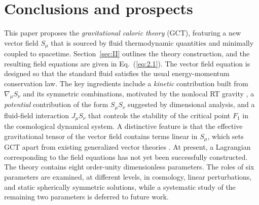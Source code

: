 \documentclass[aps,prd,twocolumn]{revtex4-2}
\begin{document}
\section{Conclusions and prospects}\label{sec:VI}
This paper proposes the \textit{gravitational caloric theory} (GCT), featuring a new vector field $S_\mu$ that is sourced by fluid thermodynamic quantities and minimally coupled to spacetime. Section~\ref{sec:II} outlines the theory construction, and the resulting field equations are given in Eq.~(\ref{eq:2.1}). The vector field equation is designed so that the standard fluid satisfies the usual energy-momentum conservation law. The key ingredients include a \textit{kinetic} contribution built from $\nabla_\mu S_\nu$ and its symmetric combinations, motivated by the nonlocal RT gravity \cite{Maggiore2014.PRD.89.043008}, a \textit{potential} contribution of the form $S_\mu S_\nu$ suggested by dimensional analysis, and a fluid-field interaction $J_\mu S_\nu$ that controls the stability of the critical point $F_1$ in the cosmological dynamical system. A distinctive feature is that the effective gravitational tensor of the vector field contains terms linear in $S_\mu$, which sets GCT apart from existing generalized vector theories \cite{Tasinato2014.JHighEnergyPhys.04.067,Heisenberg2014.JCAP.05.015}. At present, a Lagrangian corresponding to the field equations has not yet been successfully constructed. The theory contains eight order-unity dimensionless parameters. The roles of six parameters are examined, at different levels, in cosmology, linear perturbations, and static spherically symmetric solutions, while a systematic study of the remaining two parameters is deferred to future work.
\end{document}
